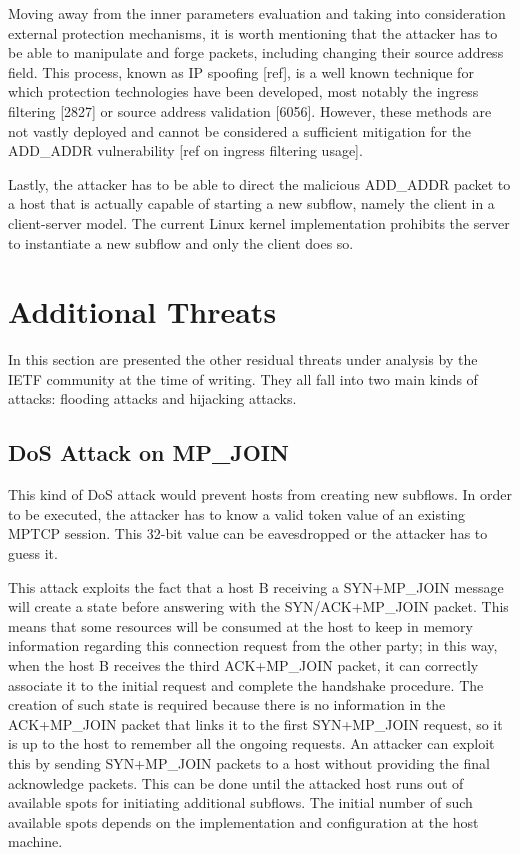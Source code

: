Moving away from the inner parameters evaluation and taking into consideration external protection mechanisms, it is worth mentioning that the attacker has to be able to manipulate and forge packets, including changing their source address field. This process, known as IP spoofing [ref], is a well known technique for which protection technologies have been developed, most notably the ingress filtering [2827] or source address validation [6056]. However, these methods are not vastly deployed and cannot be considered a sufficient mitigation for the ADD\_ADDR vulnerability [ref on ingress filtering usage].

Lastly, the attacker has to be able to direct the malicious ADD\_ADDR packet to a host that is actually capable of starting a new subflow, namely the client in a client-server model. The current Linux kernel implementation prohibits the server to instantiate a new subflow and only the client does so.

\section{Additional Threats}
In this section are presented the other residual threats under analysis by the IETF community at the time of writing. They all fall into two main kinds of attacks: flooding attacks and hijacking attacks. 

\subsection{DoS Attack on MP\_JOIN}
This kind of DoS attack would prevent hosts from creating new subflows. In order to be executed, the attacker has to know a valid token value of an existing MPTCP session. This 32-bit value can be eavesdropped or the attacker has to guess it.

This attack exploits the fact that a host B receiving a SYN+MP\_JOIN message will create a state before answering with the SYN/ACK+MP\_JOIN packet. This means that some resources will be consumed at the host to keep in memory information regarding this connection request from the other party; in this way, when the host B receives the third ACK+MP\_JOIN packet, it can correctly associate it to the initial request and complete the handshake procedure. The creation of such state is required because there is no information in the ACK+MP\_JOIN packet that links it to the first SYN+MP\_JOIN request, so it is up to the host to remember all the ongoing requests.
An attacker can exploit this by sending SYN+MP\_JOIN packets to a host without providing the final acknowledge packets. This can be done until the attacked host runs out of available spots for initiating additional subflows. The initial number of such available spots depends on the implementation and configuration at the host machine. 

